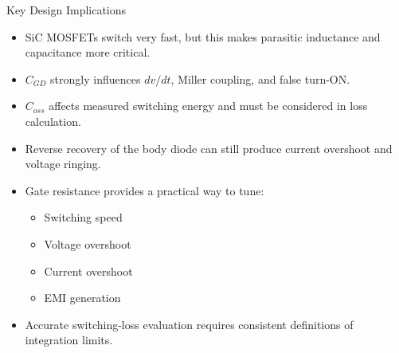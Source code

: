 \begin{frame}{Key Design Implications}
\begin{itemize}
    \item SiC MOSFETs switch very fast, but this makes parasitic inductance and capacitance more critical.
    \item $C_{GD}$ strongly influences $dv/dt$, Miller coupling, and false turn-ON.
    \item $C_{oss}$ affects measured switching energy and must be considered in loss calculation.
    \item Reverse recovery of the body diode can still produce current overshoot and voltage ringing.
    \item Gate resistance provides a practical way to tune:
    \begin{itemize}
        \item Switching speed
        \item Voltage overshoot
        \item Current overshoot
        \item EMI generation
    \end{itemize}
    \item Accurate switching-loss evaluation requires consistent definitions of integration limits.
\end{itemize}
\end{frame}



